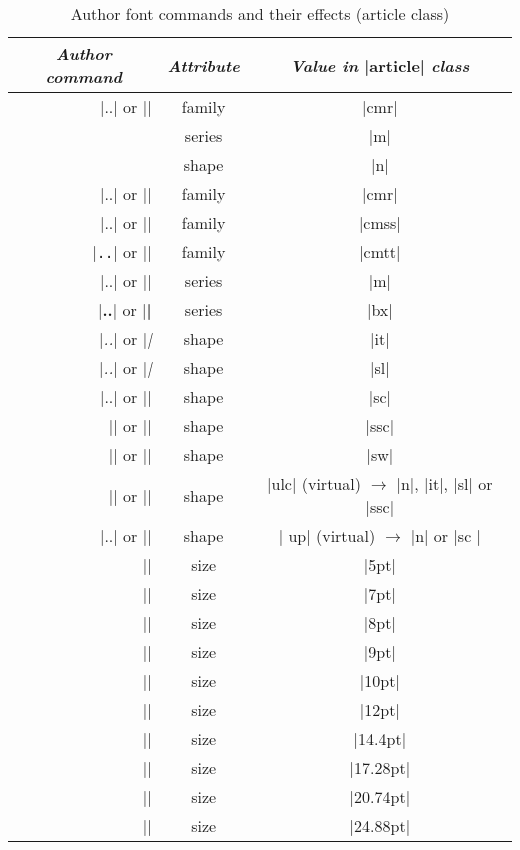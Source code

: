 \documentclass{ltxguide}[1995/11/28]
\begin{document}
\begin{table}[!tbp]
  \centering
  \begin{tabular}{@{}r@{\hspace{3pt}}c@{\hspace{1pt}}c@{}}
    \toprule
    \multicolumn{1}{c}{\emph{Author command}} & \emph{Attribute}
                          & \emph{Value in} |article| \emph{class} \\
    \midrule
    |\textnormal{..}| or |\normalfont| & family & |cmr|     \\
                                       & series & |m|       \\
                                       & shape  & |n|       \\ \midrule%
    |\textrm{..}| or |\rmfamily|       & family & |cmr|     \\
    |\textsf{..}| or |\sffamily|       & family & |cmss|    \\
    |\texttt{..}| or |\ttfamily|       & family & |cmtt|    \\
    |\textmd{..}| or |\mdseries|       & series & |m|       \\
    |\textbf{..}| or |\bfseries|       & series & |bx|      \\ \midrule%
    |\textit{..}| or |\itshape|        & shape  & |it|      \\
    |\textsl{..}| or |\slshape|        & shape  & |sl|      \\
    |\textsc{..}| or |\scshape|        & shape  & |sc|      \\
    |\textssc{..}| or |\sscshape|      & shape  & |ssc|     \\
    |\textsw{..}| or |\swshape|        & shape  & |sw|      \\
    |\textulc{..}| or |\ulcshape|      & shape  & |ulc| (virtual) $\to$ |n|, |it|, |sl| or |ssc|     \\
    |\textup{..}| or |\upshape|        & shape  & | up| (virtual) $\to$ |n| or |sc     |\phantom{, , } \\\midrule%
    |\tiny|                            & size   & |5pt|     \\
    |\scriptsize|                      & size   & |7pt|     \\
    |\footnotesize|                    & size   & |8pt|     \\
    |\small|                           & size   & |9pt|     \\
    |\normalsize|                      & size   & |10pt|    \\
    |\large|                           & size   & |12pt|    \\
    |\Large|                           & size   & |14.4pt|  \\
    |\LARGE|                           & size   & |17.28pt| \\
    |\huge|                            & size   & |20.74pt| \\
    |\Huge|                            & size   & |24.88pt| \\
    \bottomrule
  \end{tabular}
  \caption{Author font commands and their effects (article class)}\label{tab:attributes}
\end{table}
\end{document}
